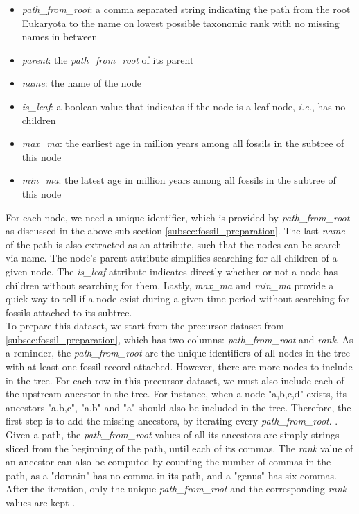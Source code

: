 \documentclass[11pt, a4paper,oneside,chapterprefix=false]{scrbook}
\newcommand{\FIXME}[1]{{\color{RED}{\textbf{FIX}: #1}}}
\begin{document}
\begin{itemize}
	\item \textit{path\_from\_root}: a comma separated string indicating the path from the root Eukaryota to the name on lowest possible taxonomic rank with no missing names in between
	\item \textit{parent}: the \textit{path\_from\_root} of its parent
	\item \textit{name}: the name of the node
	\item \textit{is\_leaf}: a boolean value that indicates if the node is a leaf node, \textit{i.e.}, has no children
	\item \textit{max\_ma}: the earliest age in million years among all fossils in the subtree of this node
	\item \textit{min\_ma}: the latest age in million years among all fossils in the subtree of this node
\end{itemize}

For each node, we need a unique identifier, which is provided by \emph{path\_from\_root} as discussed in the above sub-section \ref{subsec:fossil_preparation}. The last \emph{name} of the path is also extracted as an attribute, such that the nodes can be search via name. The node's parent attribute simplifies searching for all children of a given node. The \emph{is\_leaf} attribute indicates directly whether or not a node has children without searching for them. Lastly, \emph{max\_ma} and \emph{min\_ma} provide a quick way to tell if a node exist during a given time period without searching for fossils attached to its subtree. \\

To prepare this dataset, we start from the precursor dataset from \ref{subsec:fossil_preparation}, which has two columns: \emph{path\_from\_root} and \emph{rank}. As a reminder, the \emph{path\_from\_root} are the unique identifiers of all nodes in the tree with at least one fossil record attached. However, there are more nodes to include in the tree. For each row in this precursor dataset, we must also include each of the upstream ancestor in the tree. For instance, when a node "a,b,c,d" exists, its ancestors "a,b,c", "a,b" and "a" should also be included in the tree. Therefore, the first step is to add the missing ancestors, by iterating every \emph{path\_from\_root}. \FIXME{add pseudocode}. Given a path, the \emph{path\_from\_root} values of all its ancestors are simply strings sliced from the beginning of the path, until each of its commas. The \emph{rank} value of an ancestor can also be computed by counting the number of commas in the path, as a "domain" has no comma in its path, and a "genus" has six commas. After the iteration, only the unique \emph{path\_from\_root} and the corresponding \emph{rank} values are kept .\\
\end{document}
